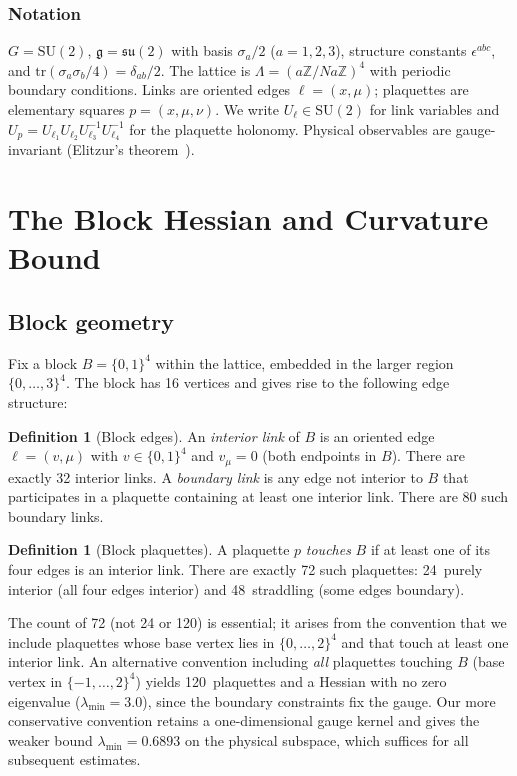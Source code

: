 \documentclass[11pt]{article}
\theoremstyle{definition}
\newtheorem{definition}[theorem]{Definition}
\newcommand{\SU}{\mathrm{SU}}
\newcommand{\su}{\mathfrak{su}}
\newcommand{\tr}{\mathrm{tr}}
\newcommand{\Z}{\mathbb{Z}}
\begin{document}
\subsubsection*{Notation} $G=\SU(2)$, $\mathfrak{g}=\su(2)$ with basis
$\sigma_a/2$ ($a=1,2,3$), structure constants $\epsilon^{abc}$,
and $\tr(\sigma_a\sigma_b/4)=\delta_{ab}/2$.  The lattice is
$\Lambda=(a\Z/Na\Z)^4$ with periodic boundary conditions.  Links are
oriented edges $\ell=(x,\mu)$; plaquettes are elementary squares
$p=(x,\mu,\nu)$.  We write $U_\ell\in\SU(2)$ for link variables and
$U_p=U_{\ell_1}U_{\ell_2}U_{\ell_3}^{-1}U_{\ell_4}^{-1}$ for the
plaquette holonomy.  Physical observables are gauge-invariant
(Elitzur's theorem~\cite{Elitzur75}).

\section{The Block Hessian and Curvature Bound}\label{sec:block}

\subsection{Block geometry}\label{subsec:blockgeom}

Fix a block $B=\{0,1\}^4$ within the lattice, embedded in the larger
region $\{0,\ldots,3\}^4$.  The block has 16 vertices and gives rise
to the following edge structure:

\begin{definition}[Block edges]\label{def:edges}
An \emph{interior link} of $B$ is an oriented edge
$\ell=(v,\mu)$ with $v\in\{0,1\}^4$ and $v_\mu=0$ (both endpoints
in $B$).  There are exactly 32 interior links.  A \emph{boundary link}
is any edge not interior to $B$ that participates in a plaquette
containing at least one interior link.  There are 80 such boundary
links.
\end{definition}

\begin{definition}[Block plaquettes]\label{def:plaq}
A plaquette $p$ \emph{touches} $B$ if at least one of its four edges
is an interior link.  There are exactly 72 such plaquettes:
24~purely interior (all four edges interior) and 48~straddling (some
edges boundary).
\end{definition}

The count of 72 (not 24 or 120) is essential; it arises from the
convention that we include plaquettes whose base vertex lies in
$\{0,\ldots,2\}^4$ and that touch at least one interior link.  An
alternative convention including \emph{all} plaquettes touching $B$
(base vertex in $\{-1,\ldots,2\}^4$) yields 120~plaquettes and a
Hessian with no zero eigenvalue ($\lambda_{\min}=3.0$), since the
boundary constraints fix the gauge.  Our more conservative convention
retains a one-dimensional gauge kernel and gives the weaker bound
$\lambda_{\min}=0.6893$ on the physical subspace, which suffices for
all subsequent estimates.
\end{document}
